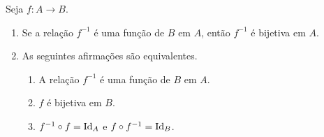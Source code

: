 \begin{theorem} \label{teo.set:bij1}
    Seja $f : A \to B$.
        \begin{enumerate}[leftmargin=*, align=left, label=\textbf{(\alph*)}]
            \item Se a relação $f^{-1}$ é uma função de $B$ em $A$, então $f^{-1}$ é bijetiva em $A$.
            \item As seguintes afirmações são equivalentes.
                \begin{enumerate}[label=\roman*.]
                    \item A relação $f^{-1}$ é uma função de $B$ em $A$.
                    \item $f$ é bijetiva em $B$.
                    \item $f^{-1} \circ f = \operatorname{Id}_{A}$ e $f \circ f^{-1} = \operatorname{Id}_{B}$.
                \end{enumerate}
        \end{enumerate}
\end{theorem}

